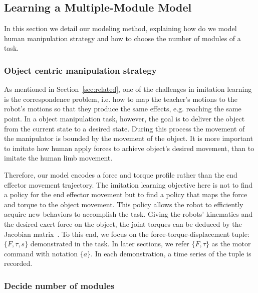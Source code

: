 \subsection{Learning a Multiple-Module Model}
\label{sec:learn}
In this section we detail our modeling method, explaining how do we model human manipulation strategy and how to choose the number of modules of a task.

\subsubsection{Object centric manipulation strategy}
\label{sec:objectlevel}
As mentioned in Section~\ref{sec:related}, one of the challenges in imitation learning is the correspondence problem, i.e. how to map the teacher's motions to the robot's motions so that they produce the same effects, e.g. reaching the same point. %
In a object manipulation task, however, the goal is to deliver the object from the current state to a desired state. During this process the movement of the manipulator is bounded by the movement of the object. It is more important to imitate how human apply forces to achieve object's desired movement, than to imitate the human limb movement. 

Therefore, our model encodes a force and torque profile rather than the end effector movement trajectory. The imitation learning objective here is not to find a policy for the end effector movement but to find a policy that maps the force and torque to the object movement. This policy allows the robot to efficiently acquire new behaviors to accomplish the task. %
Giving the robots' kinematics and the desired exert force on the object, the joint torques can be deduced by the Jacobian matrix~\cite{okamura2000overview}. To this end, we focus on the force-torque-displacement tuple: $\{F,\tau,s\}$ demonstrated in the task. In later sections, we refer $\{F,\tau\}$ as the motor command with notation $\{a\}$. In each demonstration, a time series of the tuple is recorded.



\subsubsection{Decide number of modules}
\label{sec:cluster}

